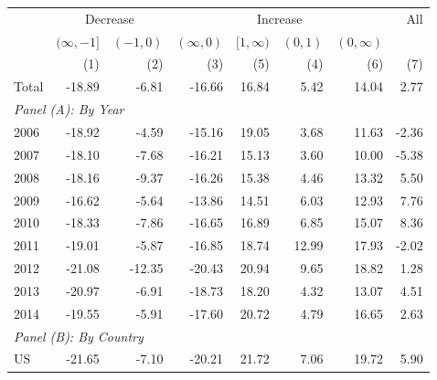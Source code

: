 \begin{table}
\begin{tabular}{lrrrrrrr}
	\hline\hline
	        & \multicolumn{2}{c}{Decrease} &                & \multicolumn{2}{c}{Increase} &                &   All \\ \cline{2-3}\cline{5-6}\cline{8-8}
	        & $ (\infty,-1] $ & $ (-1,0) $ & $ (\infty,0) $ &   $ [1,\infty) $ & $ (0,1) $ & $ (0,\infty) $ &       \\
	        &             (1) &        (2) &            (3) &              (5) &       (4) &            (6) &   (7) \\ \hline\hline
	Total   &          -18.89 &      -6.81 &         -16.66 &            16.84 &      5.42 &          14.04 &  2.77 \\ \hline\hline
	\multicolumn{8}{l}{\textit{Panel (A): By Year}}                                                                 \\ \hline
	2006    &          -18.92 &      -4.59 &         -15.16 &            19.05 &      3.68 &          11.63 & -2.36 \\
	2007    &          -18.10 &      -7.68 &         -16.21 &            15.13 &      3.60 &          10.00 & -5.38 \\
	2008    &          -18.16 &      -9.37 &         -16.26 &            15.38 &      4.46 &          13.32 &  5.50 \\
	2009    &          -16.62 &      -5.64 &         -13.86 &            14.51 &      6.03 &          12.93 &  7.76 \\
	2010    &          -18.33 &      -7.86 &         -16.65 &            16.89 &      6.85 &          15.07 &  8.36 \\
	2011    &          -19.01 &      -5.87 &         -16.85 &            18.74 &     12.99 &          17.93 & -2.02 \\
	2012    &          -21.08 &     -12.35 &         -20.43 &            20.94 &      9.65 &          18.82 &  1.28 \\
	2013    &          -20.97 &      -6.91 &         -18.73 &            18.20 &      4.32 &          13.07 &  4.51 \\
	2014    &          -19.55 &      -5.91 &         -17.60 &            20.72 &      4.79 &          16.65 &  2.63 \\ \hline
	\multicolumn{8}{l}{\textit{Panel (B): By Country}}                                                              \\ \hline
	US      &          -21.65 &      -7.10 &         -20.21 &            21.72 &      7.06 &          19.72 &  5.90 \\

\end{tabular}
\end{table}
